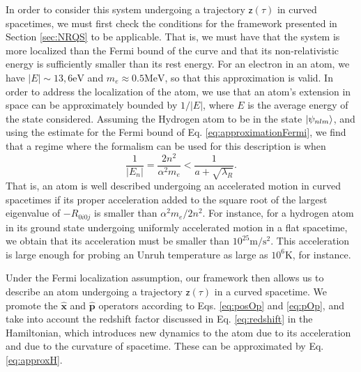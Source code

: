 \documentclass[prd,twocolumn,superscriptaddress,floatfix,amsmath,amssymb,amsfonts,longbibliography,nofootinbib]{revtex4-1}
\newcommand{\mf}{\mathsf}%
\begin{document}
In order to consider this system undergoing a trajectory $\mf z(\tau)$ in curved spacetimes, we must first check the conditions for the framework presented in Section \ref{sec:NRQS} to be applicable. That is, we must have that the system is more localized than the Fermi bound of the curve and that its non-relativistic energy is sufficiently smaller than its rest energy. For an electron in an atom, we have $|E|\sim 13,6\text{eV}$ and $m_e \approx 0.5\text{MeV}$, so that this approximation is valid. In order to address the localization of the atom, we use that an atom's extension in space can be approximately bounded by $1/|E|$, where $E$ is the average energy of the state considered. Assuming the Hydrogen atom to be in the state $\ket{\psi_{nlm}}$, and using the estimate for the Fermi bound of Eq. \eqref{eq:approximationFermi}, we find that a regime where the formalism can be used for this description is when
\begin{equation}
    \frac{1}{|E_n|} = \frac{2 n^2}{\alpha^2 m_e} < \frac{1}{a + \sqrt{\lambda_R}}.
\end{equation}
That is, an atom is well described undergoing an accelerated motion in curved spacetimes if its proper acceleration added to the square root of the largest eigenvalue of $-R_{0i0j}$ is smaller than $\alpha^2 m_e/2n^2$. For instance, for a hydrogen atom in its ground state undergoing uniformly accelerated motion in a flat spacetime, we obtain that its acceleration must be smaller than $10^{25}\text{m}/\text{s}^2$. This acceleration is large enough for probing an Unruh temperature as large as $10^6 \textrm{K}$, for instance.

Under the Fermi localization assumption, our framework then allows us to describe an atom undergoing a trajectory $\mf z(\tau)$ in a curved spacetime. We promote the $\hat{\bm x}$ and $\hat{\bm p}$ operators according to Eqs. \eqref{eq:posOp} and \eqref{eq:pOp}, and take into account the redshift factor discussed in Eq. \eqref{eq:redshift} in the Hamiltonian, which introduces new dynamics to the atom due to its acceleration and due to the curvature of spacetime. These can be approximated by Eq. \eqref{eq:approxH}.
\end{document}
